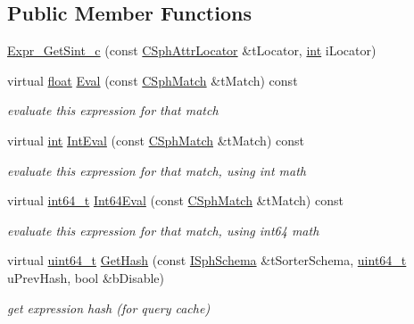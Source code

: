 \subsection*{Public Member Functions}
\begin{DoxyCompactItemize}
\item 
\hyperlink{structExpr__GetSint__c_add035de04c9a8d8684789183f411a503}{Expr\-\_\-\-Get\-Sint\-\_\-c} (const \hyperlink{structCSphAttrLocator}{C\-Sph\-Attr\-Locator} \&t\-Locator, \hyperlink{sphinxexpr_8cpp_a4a26e8f9cb8b736e0c4cbf4d16de985e}{int} i\-Locator)
\item 
virtual \hyperlink{sphinxexpr_8cpp_a0e0d0739f7035f18f949c2db2c6759ec}{float} \hyperlink{structExpr__GetSint__c_a574bb618f2002c3a50ba3bc484cdaa00}{Eval} (const \hyperlink{classCSphMatch}{C\-Sph\-Match} \&t\-Match) const 
\begin{DoxyCompactList}\small\item\em evaluate this expression for that match \end{DoxyCompactList}\item 
virtual \hyperlink{sphinxexpr_8cpp_a4a26e8f9cb8b736e0c4cbf4d16de985e}{int} \hyperlink{structExpr__GetSint__c_a8d2733949df397e77ce28b143815cee2}{Int\-Eval} (const \hyperlink{classCSphMatch}{C\-Sph\-Match} \&t\-Match) const 
\begin{DoxyCompactList}\small\item\em evaluate this expression for that match, using int math \end{DoxyCompactList}\item 
virtual \hyperlink{sphinxstd_8h_a996e72f71b11a5bb8b3b7b6936b1516d}{int64\-\_\-t} \hyperlink{structExpr__GetSint__c_a6d280c9e62bd21eff33c1f9bc0f82109}{Int64\-Eval} (const \hyperlink{classCSphMatch}{C\-Sph\-Match} \&t\-Match) const 
\begin{DoxyCompactList}\small\item\em evaluate this expression for that match, using int64 math \end{DoxyCompactList}\item 
virtual \hyperlink{sphinxstd_8h_aaa5d1cd013383c889537491c3cfd9aad}{uint64\-\_\-t} \hyperlink{structExpr__GetSint__c_a9da4dfb0b2dbc5799c27a8ca39685269}{Get\-Hash} (const \hyperlink{classISphSchema}{I\-Sph\-Schema} \&t\-Sorter\-Schema, \hyperlink{sphinxstd_8h_aaa5d1cd013383c889537491c3cfd9aad}{uint64\-\_\-t} u\-Prev\-Hash, bool \&b\-Disable)
\begin{DoxyCompactList}\small\item\em get expression hash (for query cache) \end{DoxyCompactList}\end{DoxyCompactItemize}
